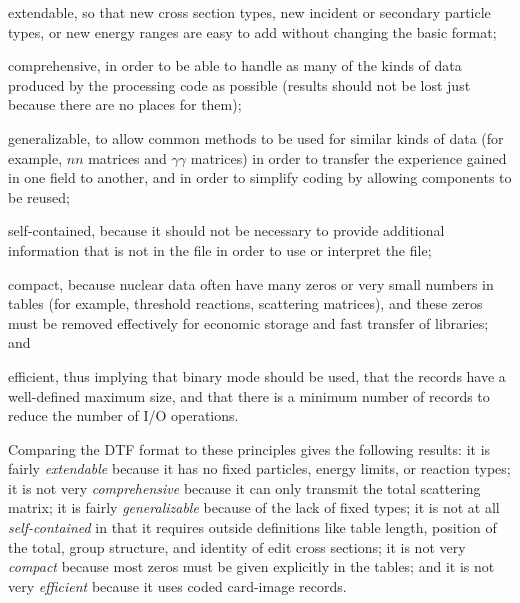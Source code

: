 \begin{description}
\begin{singlespace}
\item[extendable,]
   so that new cross section types, new incident or secondary particle
   types, or new energy ranges are easy to add without changing the
   basic format;

\item[comprehensive,]
   in order to be able to handle as many of the kinds of data produced
   by the processing code as possible (results should not be lost just
   because there are no places for them);

\item[generalizable,]
   to allow common methods to be used for similar kinds of data (for
   example, $nn$ matrices and $\gamma\gamma$ matrices) in order
   to transfer the experience gained in one field to another, and in
   order to simplify coding by allowing components to be reused;

\item[self-contained,]
   because it should not be necessary to provide additional information
   that is not in the file in order to use or interpret the file;

\item[compact,]
   because nuclear data often have many zeros or very small numbers in
   tables (for example, threshold reactions, scattering matrices),
   and these zeros must be removed effectively for economic storage
   and fast transfer of libraries; and

\item[efficient,]
   thus implying that binary mode should be used, that the records have
   a well-defined maximum size, and that there is a minimum number of
   records to reduce the number of I/O operations.
\end{singlespace}
\end{description}

Comparing the DTF format to these principles gives the following
results: it is fairly {\it extendable} because it has no fixed
particles, energy limits, or reaction types; it is not very {\it
comprehensive} because it can only transmit the total scattering
matrix; it is fairly {\it generalizable} because of the lack of fixed
types; it is not at all {\it self-contained} in that it requires
outside definitions like table length, position of the total, group
structure, and identity of edit cross sections; it is not very {\it
compact} because most zeros must be given explicitly in the tables; and
it is not very {\it efficient} because it uses coded card-image
records.

